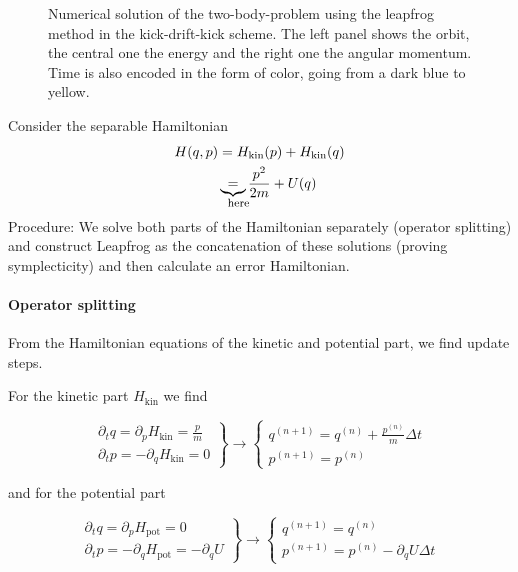 \begin{figure}[!htb]
  \centering
  \hfill
  \caption{Numerical solution of the two-body-problem using the leapfrog method in the kick-drift-kick scheme. The left panel shows the orbit, the central one the energy and the right one the angular momentum. Time is also encoded in the form of color, going from a dark blue to yellow.}
  \label{fig:leapfrog_orbit}
\end{figure}

Consider the separable Hamiltonian
\begin{equation}
  \begin{aligned}
    H(q,p) &= H_{\text{kin}}(p) + H_{\text{kin}}(q) \\
           &\explain{=}{here} \frac{p^2}{2m} + U(q)
  \end{aligned}
\end{equation}
\textcolor{blue1}{Procedure}: We solve both parts of the Hamiltonian separately (operator splitting) and construct Leapfrog as
the concatenation of these solutions (proving symplecticity) and then calculate an error Hamiltonian.

\paragraph{Operator splitting} From the Hamiltonian equations of the kinetic and potential part, we find update steps.

For the kinetic part $H_{\text{kin}}$ we find

\begin{equation}
  \left.\begin{array}{c}
  \partial_t q=\partial_p H_{\text{kin}}=\frac{p}{m} \\
  \partial_t p=-\partial_q H_{\text{kin}}= 0
  \end{array}\right\} \rightarrow\left\{\begin{array}{c}
  q^{(n+1)}=q^{(n)}+\frac{p^{(n)}}{m} \Delta t \\
  p^{(n+1)}=p^{(n)}
  \end{array}\right.
\end{equation}

and for the potential part

\begin{equation}
  \left.\begin{array}{c}
  \partial_t q=\partial_p H_{\text{pot}}=0 \\
  \partial_t p=-\partial_q H_{\text{pot}}= -\partial_q U
  \end{array}\right\} \rightarrow\left\{\begin{array}{c}
  q^{(n+1)}=q^{(n)} \\
  p^{(n+1)}=p^{(n)} - \partial_q U \Delta t
  \end{array}\right.
\end{equation}

